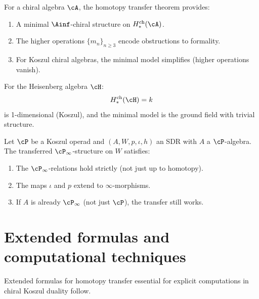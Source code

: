 \begin{application}
\label{app:minimal-chiral}
For a chiral algebra $\cA$, the homotopy transfer theorem provides:
\begin{enumerate}[label=(\roman*)]
\item A minimal $\Ainf$-chiral structure on $H^{\mathrm{ch}}_*(\cA)$.
\item The higher operations $\{m_n\}_{n \geq 3}$ encode obstructions to formality.
\item For Koszul chiral algebras, the minimal model simplifies (higher operations vanish).
\end{enumerate}

For the Heisenberg algebra $\cH$:
\[
H^{\mathrm{ch}}_*(\cH) = k
\]
is 1-dimensional (Koszul), and the minimal model is the ground field with
trivial structure.
\end{application}

\begin{theorem}
\label{thm:htt-operadic}
Let $\cP$ be a Koszul operad and $(A, W, p, \iota, h)$ an SDR with $A$ a
$\cP$-algebra. The transferred $\cP_\infty$-structure on $W$ satisfies:
\begin{enumerate}[label=(\roman*)]
\item The $\cP_\infty$-relations hold strictly (not just up to homotopy).
\item The maps $\iota$ and $p$ extend to $\infty$-morphisms.
\item If $A$ is already $\cP_\infty$ (not just $\cP$), the transfer still works.
\end{enumerate}
\end{theorem}


\section{Extended formulas and computational techniques}
\label{sec:extended-htt}

Extended formulas for homotopy transfer essential for
explicit computations in chiral Koszul duality follow.

